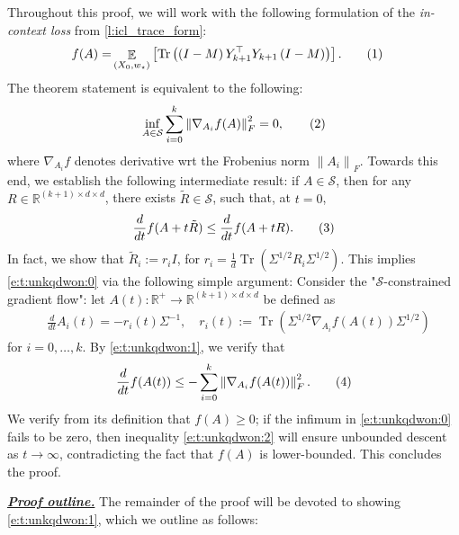 \documentclass{article}
\DeclareMathOperator{\E}{\mathbb{E}}
\newcommand{\R}{\mathbb{R}}
\renewcommand{\S}{{\mathcal S}}
\newcommand{\wstar}{w_\star}
\newcommand{\emphh}[1]{\textbf{\emph{#1}}}
\DeclareMathOperator{\tr}{Tr}
\newcommand*\lrb[1]{\left[ #1 \right]}
\newcommand*\lrn[1]{\left\| #1 \right\|}
\newcommand*\lrp[1]{\left( #1 \right)}
\newcommand\numberthis{\addtocounter{equation}{1}\tag{\theequation}}
\begin{document}
Throughout this proof, we will work with the following formulation of the \emph{in-context loss} from \autoref{l:icl_trace_form}:
\begin{align*}
f(A)
=& \E_{(X_0,\wstar)} \lrb{\tr\lrp{\lrp{I-M}Y_{k+1}^\top Y_{k+1}\lrp{I-M}}}.
\numberthis \label{e:t:oiemgrkwfdlw:0}
\end{align*}
The theorem statement is equivalent to the following:
\begin{align*}
\inf_{A \in \S} \sum_{i=0}^k \lrn{\nabla_{A_i} f(A)}_F^2 = 0,
\numberthis \label{e:t:unkqdwon:0}
\end{align*}
where $\nabla_{A_i} f$ denotes derivative wrt the Frobenius norm $\lrn{A_i}_F$. Towards this end, we establish the following intermediate result: if $A \in \S$, then for any $R\in \R^{(k+1) \times d \times d}$, there exists $\tilde{R} \in \S$, such that, at $t=0$,
\begin{align*}
\frac{d}{dt} f(A + t\tilde{R}) \leq \frac{d}{dt} f(A + tR).
\numberthis \label{e:t:unkqdwon:1}
\end{align*}
In fact, we show that $\tilde{R}_i := r_i I$, for $r_i = \frac{1}{d} \tr\lrp{\Sigma^{1/2} R_i \Sigma^{1/2}}$. This implies \eqref{e:t:unkqdwon:0} via the following simple argument: Consider the "$\S$-constrained gradient flow": let $A(t): \R^+ \to \R^{(k+1)\times d \times d}$ be defined as 
\begin{align*}
& \frac{d}{dt} A_i(t) = - r_i(t) \Sigma^{-1}, \quad r_i(t) := \tr(\Sigma^{1/2} \nabla_{A_i} f (A(t)) \Sigma^{1/2})
\end{align*}
for $i=0,\dots,k$. By \eqref{e:t:unkqdwon:1}, we verify that
\begin{align*}
\frac{d}{dt} f(A(t)) \leq - \sum_{i=0}^k \lrn{\nabla_{A_i} f(A(t))}_F^2.
\numberthis \label{e:t:unkqdwon:2}
\end{align*}
We verify from its definition that $f(A) \geq 0$; if the infimum in \eqref{e:t:unkqdwon:0} fails to be zero, then inequality \eqref{e:t:unkqdwon:2} will ensure unbounded descent as $t\to \infty$, contradicting the fact that $f(A)$ is lower-bounded. This concludes the proof.

\underline{\emphh{Proof outline.}}
The remainder of the proof will be devoted to showing \eqref{e:t:unkqdwon:1}, which we outline as follows:
\end{document}
